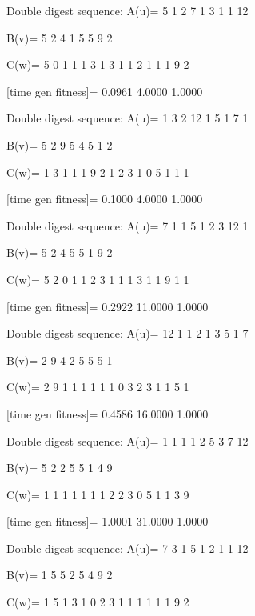 Double digest sequence:
A(u)=
     5     1     2     7     1     3     1     1    12

B(v)=
     5     2     4     1     5     5     9     2

C(w)=
     5     0     1     1     1     3     1     3     1     1     2     1     1     1     9     2

[time gen fitness]=
    0.0961    4.0000    1.0000

Double digest sequence:
A(u)=
     1     3     2    12     1     5     1     7     1

B(v)=
     5     2     9     5     4     5     1     2

C(w)=
     1     3     1     1     1     9     2     1     2     3     1     0     5     1     1     1

[time gen fitness]=
    0.1000    4.0000    1.0000

Double digest sequence:
A(u)=
     7     1     1     5     1     2     3    12     1

B(v)=
     5     2     4     5     5     1     9     2

C(w)=
     5     2     0     1     1     2     3     1     1     1     3     1     1     9     1     1

[time gen fitness]=
    0.2922   11.0000    1.0000

Double digest sequence:
A(u)=
    12     1     1     2     1     3     5     1     7

B(v)=
     2     9     4     2     5     5     5     1

C(w)=
     2     9     1     1     1     1     1     1     0     3     2     3     1     1     5     1

[time gen fitness]=
    0.4586   16.0000    1.0000

Double digest sequence:
A(u)=
     1     1     1     1     2     5     3     7    12

B(v)=
     5     2     2     5     5     1     4     9

C(w)=
     1     1     1     1     1     1     1     2     2     3     0     5     1     1     3     9

[time gen fitness]=
    1.0001   31.0000    1.0000

Double digest sequence:
A(u)=
     7     3     1     5     1     2     1     1    12

B(v)=
     1     5     5     2     5     4     9     2

C(w)=
     1     5     1     3     1     0     2     3     1     1     1     1     1     1     9     2


